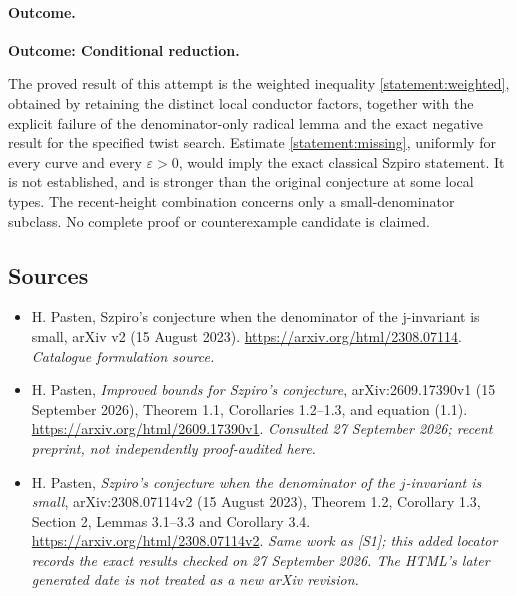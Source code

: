 \documentclass[11pt,a4paper]{article}
\numberwithin{equation}{section}
\begin{document}
\paragraph{Outcome.}
\textbf{Outcome: Conditional reduction.}

The proved result of this attempt is the weighted inequality
\eqref{statement:weighted}, obtained by retaining the distinct local conductor
factors, together with the explicit failure of the denominator-only radical
lemma and the exact negative result for the specified twist search.
Estimate \eqref{statement:missing}, uniformly for every curve and every
$\varepsilon>0$, would imply the exact classical Szpiro statement. It is
not established, and is stronger than the original conjecture at some local
types. The recent-height combination concerns only a small-denominator
subclass. No complete proof or counterexample candidate is claimed.
\subsection{Sources}
\begin{itemize}\raggedright
\item[\textnormal{[S1]}]\hypertarget{source:statement:1}{} H. Pasten, Szpiro's conjecture when the denominator of the j-invariant is small, arXiv v2 (15 August 2023).
\url{https://arxiv.org/html/2308.07114}.
{\small\textit{Catalogue formulation source.}}
\item[\textnormal{[E1]}]\hypertarget{extra:statement:1}{} H. Pasten,
\emph{Improved bounds for Szpiro's conjecture}, arXiv:2609.17390v1
(15 September 2026), Theorem 1.1, Corollaries 1.2--1.3,
and equation (1.1).
\url{https://arxiv.org/html/2609.17390v1}.
{\small\textit{Consulted 27 September 2026; recent preprint, not independently proof-audited here.}}
\item[\textnormal{[E2]}]\hypertarget{extra:statement:2}{} H. Pasten,
\emph{Szpiro's conjecture when the denominator of the $j$-invariant is small},
arXiv:2308.07114v2 (15 August 2023), Theorem 1.2, Corollary 1.3,
Section 2, Lemmas 3.1--3.3 and Corollary 3.4.
\url{https://arxiv.org/html/2308.07114v2}.
{\small\textit{Same work as [S1]; this added locator records the exact results checked on 27 September 2026. The HTML's later generated date is not treated as a new arXiv revision.}}
\end{itemize}
\end{document}
